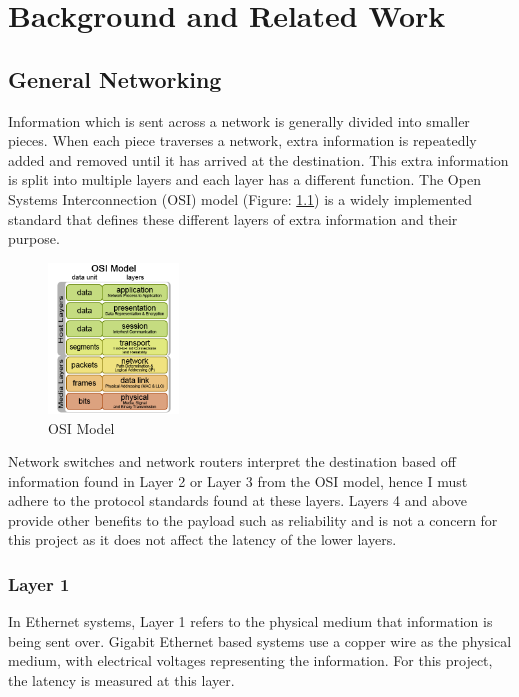 \chapter{Background and Related Work}\label{C:back}

\section{General Networking}

Information which is sent across a network is generally divided into smaller pieces. When each piece
traverses a network, extra information is repeatedly added and removed until it has arrived at the
destination. This extra information is split into multiple layers and each layer has a different function.
The Open Systems Interconnection (OSI) model (Figure: \ref{fig:OSIModel}) is a widely implemented standard that
defines these different layers of extra information and their purpose.

\begin{figure}[H]
    \begin{center}
        \includegraphics[height=4cm,keepaspectratio]{Images/OSIModel.png}
        \caption{OSI Model \cite{OSIPic}}
        \label{fig:OSIModel}
    \end{center}
\end{figure}

Network switches and network routers interpret the destination based off information found in
Layer 2 or Layer 3 from the OSI model, hence I must adhere to the protocol standards found at these
layers. Layers 4 and above provide other benefits to the payload such as reliability and is not a
concern for this project as it does not affect the latency of the lower layers.

\subsection{Layer 1}

In Ethernet systems, Layer 1 refers to the physical medium that information is being sent over.
Gigabit Ethernet based systems use a copper wire as the physical medium, with electrical voltages
representing the information. For this project, the latency is measured at this layer.

